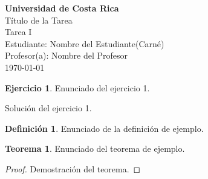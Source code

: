 \documentclass[letterpaper,11pt]{article}
\title{\titulo}
\author{\autor}
\date{\fecha}
\theoremstyle{definition}
\newtheorem{definition}{Definición}[section]
\newtheorem{theorem}{Teorema}[section]
\newtheorem{exercise}{Ejercicio}[section]
\newcommand{\titulo}{Título de la Tarea}
\newcommand{\autor}{Nombre del Estudiante}
\newcommand{\fecha}{\today}
\begin{document}
\begin{titlepage}
	\begin{center}
		\vspace*{2cm}
		\Huge
		\textbf{Universidad de Costa Rica} \\
		\vspace{1.5cm}
		\huge
		\titulo \\[1.5cm]
		Tarea I\\[1.5cm]
		\Large
		Estudiante: \autor \space (Carné)\\[1cm]
		Profesor(a): Nombre del Profesor \\[1cm]
		\fecha
	\end{center}
\end{titlepage}

\newpage

\begin{exercise}
	Enunciado del ejercicio 1.
\end{exercise}

Solución del ejercicio 1.

\begin{definition}
	Enunciado de la definición de ejemplo.
\end{definition}

\begin{theorem}
	Enunciado del teorema de ejemplo.
\end{theorem}

\begin{proof}
	Demostración del teorema.
\end{proof}

\nocite{sharples2003}


\end{document}
